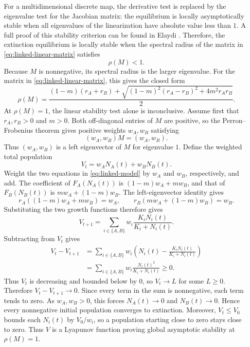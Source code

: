 \documentclass{article}
\numberwithin{equation}{section}
\begin{document}
For a multidimensional discrete map, the derivative test is replaced by
the eigenvalue test for the Jacobian matrix: the equilibrium is locally
asymptotically stable when all eigenvalues of the linearization have
absolute value less than $1$. A full proof of this stability criterion
can be found in Elaydi \cite{elaydi-2005-stability}. Therefore, the
extinction equilibrium is locally stable when the spectral radius of the
matrix in \eqref{eq:linked-linear-matrix} satisfies
\begin{equation}
    \label{eq:linked-spectral-criterion}
    \rho(M)<1.
\end{equation}
Because $M$ is nonnegative, its spectral radius is the larger eigenvalue.
For the matrix in \eqref{eq:linked-linear-matrix}, this gives the closed
form
\begin{equation}
    \label{eq:linked-spectral-radius-closed-form}
    \rho(M)
    =
    \frac{
        (1-m)(r_A+r_B)
        +
        \sqrt{(1-m)^2(r_A-r_B)^2+4m^2r_Ar_B}
    }{2}.
\end{equation}
At $\rho(M)=1$, the linear stability test alone is inconclusive.
Assume first that $r_A,r_B>0$ and $m>0$. Both off-diagonal entries of
$M$ are positive, so the Perron--Frobenius theorem
\cite[Theorem~2.12(iv), p.~30]{bullo-perron-frobenius} gives positive
weights $w_A,w_B$ satisfying
\begin{equation*}
    (w_A,w_B)M=(w_A,w_B).
\end{equation*}
Thus $(w_A,w_B)$ is a left eigenvector of $M$ for eigenvalue $1$.
Define the weighted total population
\begin{equation*}
    V_t=w_A N_A(t)+w_B N_B(t).
\end{equation*}
Weight the two equations in \eqref{eq:linked-model} by $w_A$ and $w_B$,
respectively, and add. The coefficient of $F_A(N_A(t))$ is
$(1-m)w_A+mw_B$, and that of $F_B(N_B(t))$ is $mw_A+(1-m)w_B$.
The left-eigenvector identity gives
\[
r_A((1-m)w_A+mw_B)=w_A,\qquad r_B(mw_A+(1-m)w_B)=w_B .
\]
Substituting the two growth functions therefore gives
\begin{equation*}
    V_{t+1}=\sum_{i\in\{A,B\}}w_i
    \frac{K_iN_i(t)}{K_i+N_i(t)}.
\end{equation*}
Subtracting from $V_t$ gives
\begin{align*}
    V_t-V_{t+1}
    &=\sum_{i\in\{A,B\}}w_i\left(
    N_i(t)-\frac{K_iN_i(t)}{K_i+N_i(t)}\right)\\
    &=\sum_{i\in\{A,B\}}w_i
    \frac{N_i(t)^2}{K_i+N_i(t)}\geq0.
\end{align*}
Thus $V_t$ is decreasing and bounded below by $0$, so $V_t\to L$
for some $L\geq0$. Therefore $V_t-V_{t+1}\to0$.
Since every term in the sum is nonnegative, each term tends to zero.
As $w_A,w_B>0$, this forces $N_A(t)\to0$ and $N_B(t)\to0$.
Hence every nonnegative initial population converges to extinction.
Moreover, $V_t\leq V_0$ bounds each $N_i(t)$ by $V_0/w_i$, so a
population starting close to zero stays close to zero. Thus $V$ is a
Lyapunov function proving global asymptotic stability at $\rho(M)=1$.
\end{document}
